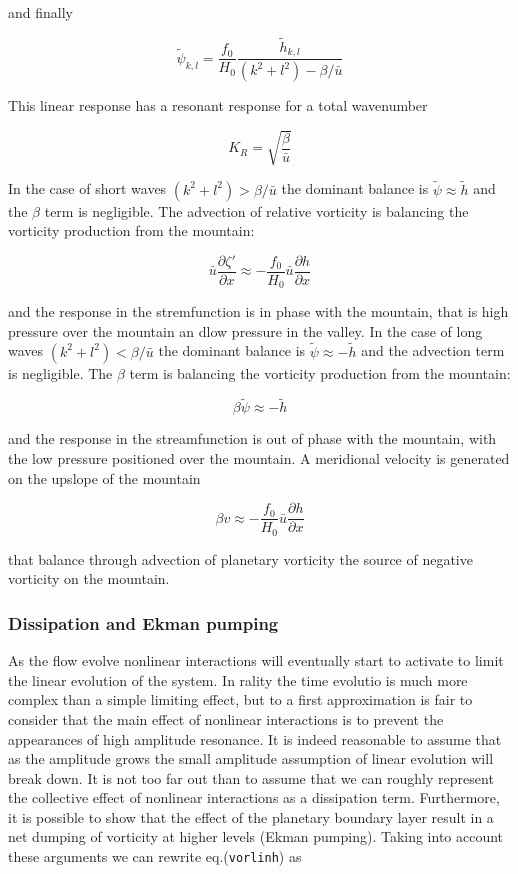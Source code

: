 and finally

{\[\tilde{\psi}_{k,l} = \frac{f_0}{H_0}\frac{\tilde{h}_{k,l}}{(k^2+l^2) - \beta / \bar{u}}\]}

This linear response has a resonant response for a total wavenumber

\[K_R = \sqrt{\frac{\beta}{\bar{u}}}\]

In the case of short waves \((k^2+l^2) > \beta / \bar{u}\) the dominant
balance is \(\tilde{\psi} \approx \tilde{h}\) and the \(\beta\) term is
negligible. The advection of relative vorticity is balancing the
vorticity production from the mountain:

\[\bar{u}\frac{\partial \zeta'}{\partial x} \approx -\frac{f_0}{H_0} \bar{u}\frac{\partial h}{\partial x}\]

and the response in the stremfunction is in phase with the mountain,
that is high pressure over the mountain an dlow pressure in the valley.
In the case of long waves \((k^2+l^2) < \beta / \bar{u}\) the dominant
balance is \(\tilde{\psi} \approx -\tilde{h}\) and the advection term is
negligible. The \(\beta\) term is balancing the vorticity production
from the mountain:

\[\beta \tilde{\psi} \approx -\tilde{h}\]

and the response in the streamfunction is out of phase with the
mountain, with the low pressure positioned over the mountain. A
meridional velocity is generated on the upslope of the mountain

\[\beta v \approx  -\frac{f_0}{H_0} \bar{u}\frac{\partial h}{\partial x}\]

that balance through advection of planetary vorticity the source of
negative vorticity on the mountain.

\subsubsection{Dissipation and Ekman
pumping}\label{dissipation-and-ekman-pumping}

As the flow evolve nonlinear interactions will eventually start to
activate to limit the linear evolution of the system. In rality the time
evolutio is much more complex than a simple limiting effect, but to a
first approximation is fair to consider that the main effect of
nonlinear interactions is to prevent the appearances of high amplitude
resonance. It is indeed reasonable to assume that as the amplitude grows
the small amplitude assumption of linear evolution will break down. It
is not too far out than to assume that we can roughly represent the
collective effect of nonlinear interactions as a dissipation term.
Furthermore, it is possible to show that the effect of the planetary
boundary layer result in a net dumping of vorticity at higher levels
(Ekman pumping). Taking into account these arguments we can rewrite
eq.(\texttt{vorlinh}) as

